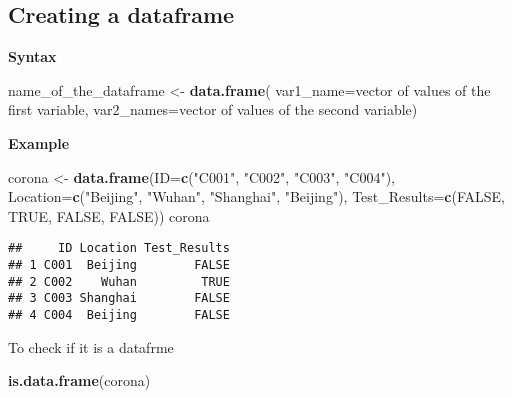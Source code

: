 \documentclass[]{book}
\newenvironment{Shaded}{\begin{snugshade}}{\end{snugshade}}
\newcommand{\DataTypeTok}[1]{\textcolor[rgb]{0.13,0.29,0.53}{#1}}
\newcommand{\KeywordTok}[1]{\textcolor[rgb]{0.13,0.29,0.53}{\textbf{#1}}}
\newcommand{\NormalTok}[1]{#1}
\newcommand{\OtherTok}[1]{\textcolor[rgb]{0.56,0.35,0.01}{#1}}
\newcommand{\StringTok}[1]{\textcolor[rgb]{0.31,0.60,0.02}{#1}}
\begin{document}
\hypertarget{creating-a-dataframe}{%
\subsection{Creating a dataframe}\label{creating-a-dataframe}}

\textbf{Syntax}

\begin{Shaded}
\begin{Highlighting}[]
\NormalTok{name_of_the_dataframe <-}\StringTok{ }\KeywordTok{data.frame}\NormalTok{(}
                          \DataTypeTok{var1_name=}\NormalTok{vector of values of the first variable,}
                          \DataTypeTok{var2_names=}\NormalTok{vector of values of the second variable)}
\end{Highlighting}
\end{Shaded}

\textbf{Example}

\begin{Shaded}
\begin{Highlighting}[]
\NormalTok{corona <-}\StringTok{ }\KeywordTok{data.frame}\NormalTok{(}\DataTypeTok{ID=}\KeywordTok{c}\NormalTok{(}\StringTok{"C001"}\NormalTok{, }\StringTok{"C002"}\NormalTok{, }\StringTok{"C003"}\NormalTok{, }\StringTok{"C004"}\NormalTok{),}
                     \DataTypeTok{Location=}\KeywordTok{c}\NormalTok{(}\StringTok{"Beijing"}\NormalTok{, }\StringTok{"Wuhan"}\NormalTok{, }\StringTok{"Shanghai"}\NormalTok{, }\StringTok{"Beijing"}\NormalTok{),}
                     \DataTypeTok{Test_Results=}\KeywordTok{c}\NormalTok{(}\OtherTok{FALSE}\NormalTok{, }\OtherTok{TRUE}\NormalTok{, }\OtherTok{FALSE}\NormalTok{, }\OtherTok{FALSE}\NormalTok{))}
\NormalTok{corona}
\end{Highlighting}
\end{Shaded}

\begin{verbatim}
##     ID Location Test_Results
## 1 C001  Beijing        FALSE
## 2 C002    Wuhan         TRUE
## 3 C003 Shanghai        FALSE
## 4 C004  Beijing        FALSE
\end{verbatim}

To check if it is a datafrme

\begin{Shaded}
\begin{Highlighting}[]
\KeywordTok{is.data.frame}\NormalTok{(corona)}
\end{Highlighting}
\end{Shaded}
\end{document}
